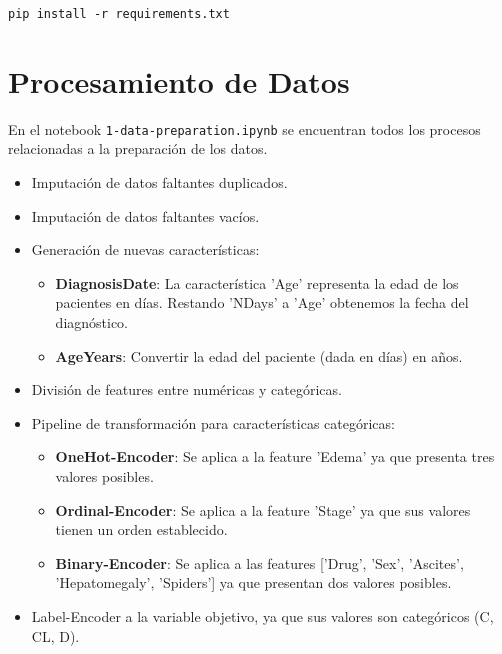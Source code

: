 \documentclass[11pt,a4paper]{report}
\begin{document}
\texttt{pip install -r requirements.txt}



\chapter*{Procesamiento de Datos}

En el notebook \texttt{1-data-preparation.ipynb} se encuentran todos los procesos relacionadas a la preparación de los datos.

\begin{itemize}
    \item Imputación de datos faltantes duplicados.
    \item Imputación de datos faltantes vacíos.
    \item Generación de nuevas características:
        \begin{itemize}
            \item \textbf{DiagnosisDate}: La característica 'Age' representa la edad de los pacientes en días. Restando 'NDays' a 'Age' obtenemos la fecha del diagnóstico.
            \item \textbf{AgeYears}: Convertir la edad del paciente (dada en días) en años.
        \end{itemize}
    \item División de features entre numéricas y categóricas.
    \item Pipeline de transformación para características categóricas:
        \begin{itemize}
            \item \textbf{OneHot-Encoder}: Se aplica a la feature 'Edema' ya que presenta tres valores posibles.
            \item \textbf{Ordinal-Encoder}: Se aplica a la feature 'Stage' ya que sus valores tienen un orden establecido.
            \item \textbf{Binary-Encoder}: Se aplica a las features ['Drug', 'Sex', 'Ascites', 'Hepatomegaly', 'Spiders'] ya que presentan dos valores posibles.
        \end{itemize}
    \item Label-Encoder a la variable objetivo, ya que sus valores son categóricos (C, CL, D).
\end{itemize}


\end{document}
